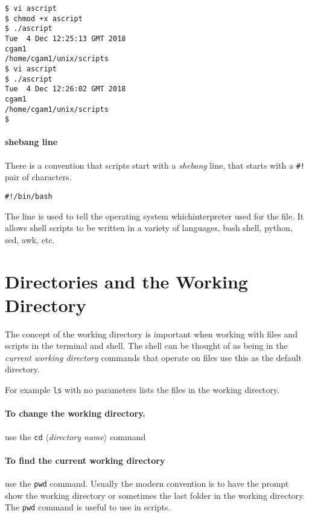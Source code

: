 \documentclass[12pt,a4paper]{article}
\begin{document}
\begin{terminal}
\begin{verbatim}
$ vi ascript
$ chmod +x ascript
$ ./ascript
Tue  4 Dec 12:25:13 GMT 2018
cgam1
/home/cgam1/unix/scripts
$ vi ascript
$ ./ascript
Tue  4 Dec 12:26:02 GMT 2018
cgam1
/home/cgam1/unix/scripts
$
\end{verbatim}
\end{terminal}

\paragraph{shebang line}
There is a convention that scripts start with a \emph{shebang} line, that
starts with a \verb'#!' pair of characters.
\begin{code}
\begin{verbatim}
#!/bin/bash
\end{verbatim}
\end{code}
The line is used to tell the operating system whichinterpreter used for the
file.  It allows shell scripts to be written in a variety of languages, bash
shell, python, sed, awk, etc.

\section{Directories and the Working Directory}
The concept of the working directory is important when working with files and
scripts in the terminal and shell.  The shell can be thought of as being in the
\emph{current working directory} commands that operate on files use this as the
default directory.

For example \texttt{ls} with no parameters lists the files in the working
directory.

\paragraph{To change the working directory.}  use the \texttt{cd}
$\langle$\emph{directory name}$\rangle$ command

\paragraph{To find the current working directory} use the \texttt{pwd} command.
Usually the modern convention is to have the prompt show the working directory
or sometimes the last folder in the working directory.  The \texttt{pwd}
command is useful to use in scripts.
\end{document}
